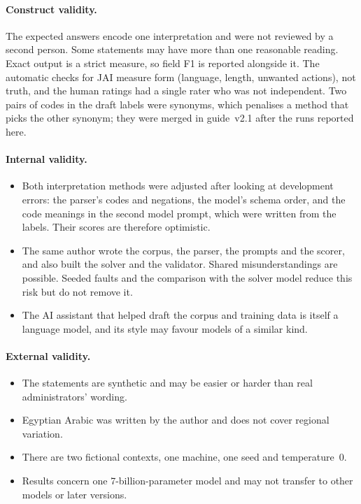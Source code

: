 \paragraph{Construct validity.} The expected answers encode one interpretation and were not reviewed by a second person. Some statements may have more than one reasonable reading. Exact output is a strict measure, so field F1 is reported alongside it. The automatic checks for JAI measure form (language, length, unwanted actions), not truth, and the human ratings had a single rater who was not independent. Two pairs of codes in the draft labels were synonyms, which penalises a method that picks the other synonym; they were merged in guide~v2.1 after the runs reported here.

\paragraph{Internal validity.}
\begin{itemize}
\item Both interpretation methods were adjusted after looking at development errors: the parser's codes and negations, the model's schema order, and the code meanings in the second model prompt, which were written from the labels. Their scores are therefore optimistic.
\item The same author wrote the corpus, the parser, the prompts and the scorer, and also built the solver and the validator. Shared misunderstandings are possible. Seeded faults and the comparison with the solver model reduce this risk but do not remove it.
\item The AI assistant that helped draft the corpus and training data is itself a language model, and its style may favour models of a similar kind.
\end{itemize}

\paragraph{External validity.}
\begin{itemize}
\item The statements are synthetic and may be easier or harder than real administrators' wording.
\item Egyptian Arabic was written by the author and does not cover regional variation.
\item There are two fictional contexts, one machine, one seed and temperature~0.
\item Results concern one 7-billion-parameter model and may not transfer to other models or later versions.
\end{itemize}

